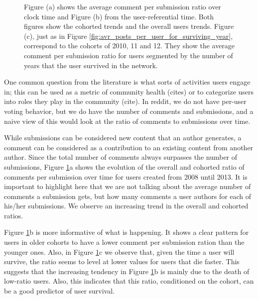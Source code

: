 \begin{figure}[!tb]
\begin{subfigure}{1\textwidth}
\caption{}\end{subfigure}
\caption{Figure (a) shows the average comment per submission ratio over clock time and Figure (b) from the user-referential time. Both figures show the cohorted trends and the overall users trends. Figure (c), just as in Figure \ref{fig:avr_posts_per_user_for_surviving_year}, correspond to the cohorts of 2010, 11 and 12. They show the average comment per submission ratio for users segmented by the number of years that the user survived in the network.}
\label{fig:comments_submissions}
\end{figure}

One common question from the literature is what sorts of activities users engage in; this can be used as a metric of community health (cites) or to categorize users into roles they play in the community (cite).  In reddit, we do not have per-user voting behavior, but we do have the number of comments and submissions, and a naive view of this would look at the ratio of comments to submissions over time.

While submissions can be considered new content that an author generates, a comment can be considered as a contribution to an existing content from another author. Since the total number of comments always surpasses the number of submissions, Figure \ref{fig:comments_submissions}a shows the evolution of the overall and cohorted ratio of comments per submission over time for users created from 2008 until 2013. It is important to highlight here that we are not talking about the average number of comments a submission gets, but how many comments a user authors for each of his/her submissions. We observe an increasing trend in the overall and cohorted ratios.

Figure \ref{fig:comments_submissions}b is more informative of what is happening. It shows a clear pattern for users in older cohorts to have a lower comment per submission ration than the younger ones. Also, in Figure \ref{fig:comments_submissions}c we observe that, given the time a user will survive, the ratio seems to level at lower values for users that die faster. This suggests that the increasing tendency in Figure \ref{fig:comments_submissions}b is mainly due to the death of low-ratio users. Also, this indicates that this ratio, conditioned on the cohort, can be a good predictor of user survival.

